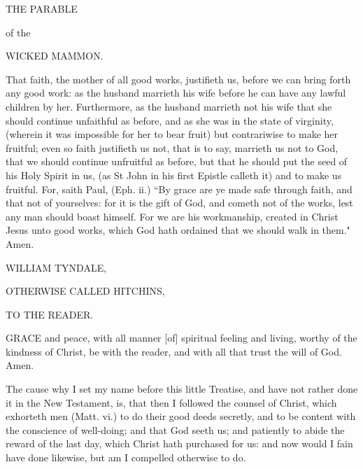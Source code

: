 \documentclass{article}
\begin{document}
THE PARABLE 

of the

WICKED MAMMON. 



That faith, the mother of all good works, justifieth us, before we can bring 
forth any good work: as the husband marrieth his wife before he can have 
any lawful children by her. Furthermore, as the husband marrieth not 
his wife that she should continue unfaithful as before, and as she was in 
the state of virginity, (wherein it was impossible for her to bear fruit) but 
contrariwise to make her fruitful; even so faith justifieth us not, that is to 
say, marrieth us not to God, that we should continue unfruitful as before, 
but that he should put the seed of his Holy Spirit in us, (as St John in his 
first Epistle calleth it) and to make us fruitful. For, saith Paul, (Eph. ii.) 
``By grace are ye made safe through faith, and that not of yourselves: for 
it is the gift of God, and cometh not of the works, lest any man should 
boast himself. For we are his workmanship, created in Christ Jesus unto 
good works, which God hath ordained that we should walk in them." Amen. 



WILLIAM TYNDALE, 

OTHERWISE CALLED HITCHINS, 

TO THE READER. 



GRACE and peace, with all manner [of]
spiritual feeling and living, worthy of the
kindness of Christ, be with the reader, and with 
all that trust the will of God. Amen. 

The cause why I set my name before this
little Treatise, and have not rather done it in
the New Testament, is, that then I followed
the counsel of Christ, which exhorteth men
(Matt. vi.) to do their good deeds secretly, and
to be content with the conscience of well-doing; 
and that God seeth us; and patiently to abide 
the reward of the last day, which Christ hath 
purchased for us: and now would I fain have 
done likewise, but am I compelled otherwise 
to do. 
\end{document}
